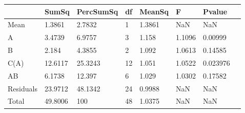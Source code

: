 \begin{table} 
\begin{tabular}{llllllll}
 & SumSq & PercSumSq & df & MeanSq & F & Pvalue \\ 
 \hline 
Mean & 1.3861 & 2.7832 & 1 & 1.3861 & NaN & NaN \\ 
A & 3.4739 & 6.9757 & 3 & 1.158 & 1.1096 & 0.00999 \\ 
B & 2.184 & 4.3855 & 2 & 1.092 & 1.0613 & 0.14585 \\ 
C(A) & 12.6117 & 25.3243 & 12 & 1.051 & 1.0522 & 0.023976 \\ 
AB & 6.1738 & 12.397 & 6 & 1.029 & 1.0302 & 0.17582 \\ 
Residuals & 23.9712 & 48.1342 & 24 & 0.9988 & NaN & NaN \\ 
Total & 49.8006 & 100 & 48 & 1.0375 & NaN & NaN \\ 
\end{tabular} 
\end{table} 
